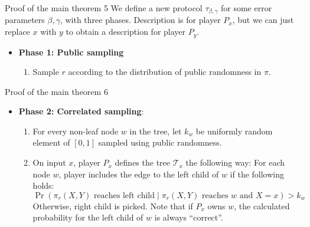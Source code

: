 \documentclass[10pt]{beamer}
\newcommand\T{\mathcal{T}}
\begin{document}
\begin{frame}{Proof of the main theorem 5}
We define a new protocol $\tau_{\beta, \gamma}$ for some error parameters $\beta, \gamma$, with three phases. Description is for player $P_x$, but we can just replace $x$ with $y$ to obtain a description for player $P_y$.
\vskip 0.5cm
\pause
\begin{itemize}
    \item \textbf{Phase 1: Public sampling}
    \begin{enumerate}
        \item Sample $r$ according to the distribution of public randomness in $\pi$.
    \end{enumerate}
\end{itemize}
\end{frame}

\begin{frame}{Proof of the main theorem 6}
\begin{itemize}
    \item \textbf{Phase 2: Correlated sampling}: 
    \begin{enumerate}
    \pause
        \item For every non-leaf node $w$ in the tree, let $k_w$ be uniformly random element of $[0,1]$ sampled using public randomness.
        \vskip 0.2cm
        \pause
        \item On input $x$, player $P_x$ defines the tree $\T_x$ the following way:
        \vskip 0.2cm
        For each node $w$, player includes the edge to the left child of $w$ if the following holds:
        $$ \Pr( \textrm{$\pi_r(X,Y)$ reaches left child} \;|\; \textrm{$\pi_r(X,Y)$ reaches $w$ and $X = x$} ) > k_w $$
        Otherwise, right child is picked. Note that if $P_x$ owns $w$, the calculated probability for the left child of $w$ is always ``correct''.
    \end{enumerate}
\end{itemize}
\end{frame}
\end{document}

